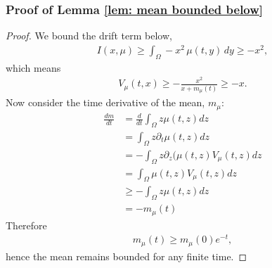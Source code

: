 \documentclass[10pt]{article}
\begin{document}
\subsubsection*{Proof of Lemma \ref{lem: mean bounded below}}
\begin{proof}
    We bound the drift term below,
    \begin{align*}
        I(x,\mu) \geq \int_{\Omega} -x^2\,\mu(t,y)\,dy \geq -x^2,
    \end{align*}
    which means
    \begin{align*}
        V_\mu(t,x) \geq -\frac{x^2}{x+m_{\mu}(t)} \geq -x.
    \end{align*}
    Now consider the time derivative of the mean, $m_\mu$:
    \begin{align*}
        \frac{dm}{dt} &= \frac{d}{dt} \int_\Omega z\mu(t,z) dz\\
        &=  \int_\Omega z\partial_t\mu(t,z) dz\\
        &=  -\int_\Omega z  \partial_z (\mu(t,z) V_\mu(t,z) dz\\
        &=  \int_\Omega \mu(t,z) V_\mu(t,z) dz\\
        &\geq - \int_\Omega z\mu(t,z) dz\\
        &= -m_\mu(t)
    \end{align*}
    Therefore
    \begin{align*}
        m_\mu(t) \geq m_\mu(0)e^{-t},
    \end{align*}
    hence the mean remains bounded for any finite time.
\end{proof}
\end{document}
